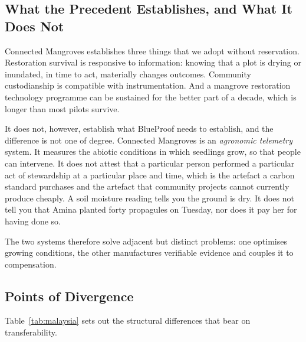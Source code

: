 \documentclass[10pt,twocolumn,a4paper]{article}
\begin{document}
\subsection{What the Precedent Establishes, and What It Does Not}

Connected Mangroves establishes three things that we adopt without reservation.
Restoration survival is responsive to information: knowing that a plot is
drying or inundated, in time to act, materially changes outcomes. Community
custodianship is compatible with instrumentation. And a mangrove restoration
technology programme can be sustained for the better part of a decade, which is
longer than most pilots survive.

It does not, however, establish what BlueProof needs to establish, and the
difference is not one of degree. Connected Mangroves is an \emph{agronomic
telemetry} system. It measures the abiotic conditions in which seedlings grow,
so that people can intervene. It does not attest that a particular person
performed a particular act of stewardship at a particular place and time, which
is the artefact a carbon standard purchases and the artefact that community
projects cannot currently produce cheaply. A soil moisture reading tells you the
ground is dry. It does not tell you that Amina planted forty propagules on
Tuesday, nor does it pay her for having done so.

The two systems therefore solve adjacent but distinct problems: one optimises
growing conditions, the other manufactures verifiable evidence and couples it to
compensation.

\subsection{Points of Divergence}

Table~\ref{tab:malaysia} sets out the structural differences that bear on
transferability.
\end{document}
